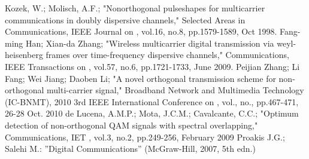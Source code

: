 \documentclass[draftcls,12pt, onecolumn, twoside]{IEEEtran}
\begin{document}
\begin{thebibliography}{}

Kozek, W.; Molisch, A.F.;  "Nonorthogonal pulseshapes for multicarrier communications in doubly dispersive channels," Selected Areas in Communications, IEEE Journal on , vol.16, no.8, pp.1579-1589, Oct 1998.
Fang-ming Han; Xian-da Zhang;  "Wireless multicarrier digital transmission via weyl-heisenberg frames over time-frequency dispersive channels," Communications, IEEE Transactions on , vol.57, no.6, pp.1721-1733, June 2009.
Peijian Zhang; Li Fang; Wei Jiang; Daoben Li; "A novel orthogonal transmission scheme for non-orthogonal multi-carrier signal," Broadband Network and Multimedia Technology (IC-BNMT), 2010 3rd IEEE International Conference on , vol., no., pp.467-471, 26-28 Oct. 2010
de Lucena, A.M.P.; Mota, J.C.M.; Cavalcante, C.C.;  "Optimum detection of non-orthogonal QAM signals with spectral overlapping," Communications, IET , vol.3, no.2, pp.249-256, February 2009
Proakis J.G.; Salehi M.: ''Digital Communications'' (McGraw-Hill, 2007, 5th edn.)
\end{thebibliography}
\end{document}
